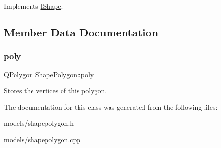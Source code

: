 Implements \mbox{\hyperlink{class_i_shape_a485f6770c4e56b31c76d368b959b6f00}{I\+Shape}}.



\subsection{Member Data Documentation}
\mbox{\label{class_shape_polygon_a28be8d33f69f3e0e895acd9d574a814f}} 
\subsubsection{\texorpdfstring{poly}{poly}}
{\footnotesize\ttfamily Q\+Polygon Shape\+Polygon\+::poly}

Stores the vertices of this polygon. 

The documentation for this class was generated from the following files\+:\begin{DoxyCompactItemize}
\item 
models/shapepolygon.\+h\item 
models/shapepolygon.\+cpp\end{DoxyCompactItemize}

